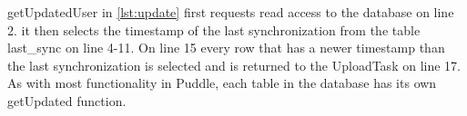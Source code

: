 

getUpdatedUser in \autoref{lst:update} first requests read access to the database on line 2. it then selects the timestamp of the last synchronization from the table last\_sync on line 4-11. On line 15 every row that has a newer timestamp than the last synchronization is selected and is returned to the UploadTask on line 17. As with most functionality in Puddle, each table in the database has its own getUpdated function.

